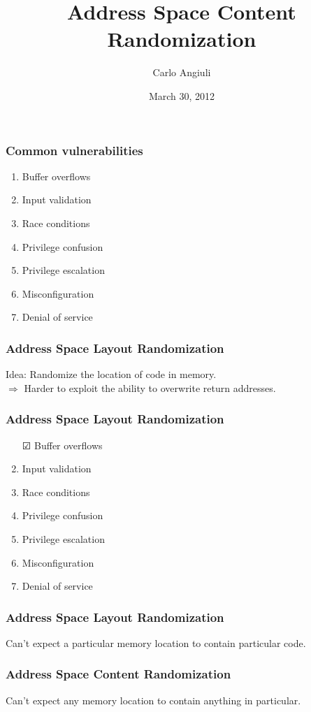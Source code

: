 \documentclass{beamer}
\title{Address Space Content Randomization}
\author{Carlo Angiuli}
\date{March 30, 2012}
\institute{Carnegie Mellon University}
\begin{document}
\begin{frame}
\maketitle
\end{frame}

\begin{frame}
\frametitle{Common vulnerabilities}
\begin{enumerate}[$\Square$]
\item Buffer overflows
\item Input validation
\item Race conditions
\item Privilege confusion
\item Privilege escalation
\item Misconfiguration
\item Denial of service
\end{enumerate}
\end{frame}

\begin{frame}
\frametitle{Address Space Layout Randomization}
\alert{Idea:} Randomize the location of code in memory.
\\ \vspace{1em}
$\Rightarrow$ Harder to exploit the ability to overwrite return addresses.
\end{frame}

\begin{frame}
\frametitle{Address Space Layout Randomization}
\begin{enumerate}[$\Square$]
\item[$\CheckedBox$] Buffer overflows
\item Input validation
\item Race conditions
\item Privilege confusion
\item Privilege escalation
\item Misconfiguration
\item Denial of service
\end{enumerate}
\end{frame}

\begin{frame}
\frametitle{Address Space Layout Randomization}
\small Can't expect a particular \alert{memory location} to contain
particular \alert{code}.
\end{frame}

\begin{frame}
\frametitle{Address Space Content Randomization}
\small Can't expect any \alert{memory location} to contain \alert{anything} in
particular.
\end{frame}
\end{document}
